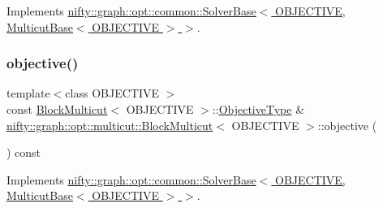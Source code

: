 Implements \hyperlink{classnifty_1_1graph_1_1opt_1_1common_1_1SolverBase_af638b9a804cfec3e35fe87c77e942d30}{nifty\+::graph\+::opt\+::common\+::\+Solver\+Base$<$ O\+B\+J\+E\+C\+T\+I\+V\+E, Multicut\+Base$<$ O\+B\+J\+E\+C\+T\+I\+V\+E $>$ $>$}.

\mbox{\label{classnifty_1_1graph_1_1opt_1_1multicut_1_1BlockMulticut_a88c479b394180da4220c855c35a1c230}} 
\subsubsection{\texorpdfstring{objective()}{objective()}}
{\footnotesize\ttfamily template$<$class O\+B\+J\+E\+C\+T\+I\+VE $>$ \\
const \hyperlink{classnifty_1_1graph_1_1opt_1_1multicut_1_1BlockMulticut}{Block\+Multicut}$<$ O\+B\+J\+E\+C\+T\+I\+VE $>$\+::\hyperlink{classnifty_1_1graph_1_1opt_1_1multicut_1_1BlockMulticut_a3a9ea9285ed606615a72dead69babd0a}{Objective\+Type} \& \hyperlink{classnifty_1_1graph_1_1opt_1_1multicut_1_1BlockMulticut}{nifty\+::graph\+::opt\+::multicut\+::\+Block\+Multicut}$<$ O\+B\+J\+E\+C\+T\+I\+VE $>$\+::objective (\begin{DoxyParamCaption}{ }\end{DoxyParamCaption}) const\hspace{0.3cm}{\ttfamily [virtual]}}



Implements \hyperlink{classnifty_1_1graph_1_1opt_1_1common_1_1SolverBase_a55e9eb645c07d6e0782ebfb990ab3c84}{nifty\+::graph\+::opt\+::common\+::\+Solver\+Base$<$ O\+B\+J\+E\+C\+T\+I\+V\+E, Multicut\+Base$<$ O\+B\+J\+E\+C\+T\+I\+V\+E $>$ $>$}.

\mbox{\label{classnifty_1_1graph_1_1opt_1_1multicut_1_1BlockMulticut_a29a5496f518f94ec2b7821a2a226c4bf}} 
